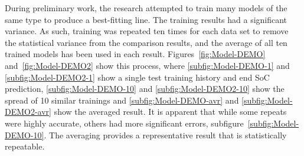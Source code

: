 %
During preliminary work, the research attempted to train many models of the same type to produce a best-fitting line.
The training results had a significant variance.
As such, training was repeated ten times for each data set to remove the statistical variance from the comparison results, and the average of all ten trained models has been used in each result.
Figures~\ref{fig:Model-DEMO} and~\ref{fig:Model-DEMO2} show this process, where \ref{subfig:Model-DEMO-1} and \ref{subfig:Model-DEMO2-1} show a single test training history and end SoC prediction, \ref{subfig:Model-DEMO-10} and \ref{subfig:Model-DEMO2-10} show the spread of 10 similar trainings and \ref{subfig:Model-DEMO-avr} and \ref{subfig:Model-DEMO2-avr} show the averaged result.
It is apparent that while some repeats were highly accurate, others had more significant errors, subfigure~\ref{subfig:Model-DEMO-10}.
The averaging provides a representative result that is statistically repeatable.
